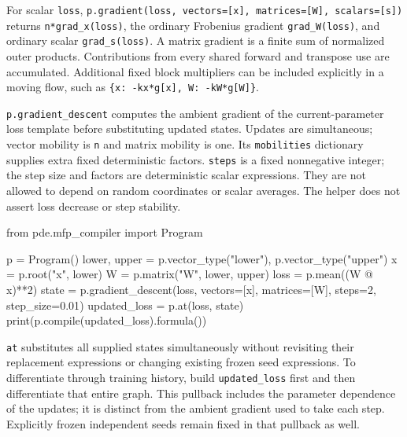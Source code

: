 \documentclass[
  11pt,
]{article}
\newenvironment{Shaded}{\begin{snugshade}}{\end{snugshade}}
\newcommand{\BuiltInTok}[1]{\textcolor[rgb]{0.00,0.23,0.31}{#1}}
\newcommand{\DecValTok}[1]{\textcolor[rgb]{0.68,0.00,0.00}{#1}}
\newcommand{\FloatTok}[1]{\textcolor[rgb]{0.68,0.00,0.00}{#1}}
\newcommand{\ImportTok}[1]{\textcolor[rgb]{0.00,0.46,0.62}{#1}}
\newcommand{\NormalTok}[1]{\textcolor[rgb]{0.00,0.23,0.31}{#1}}
\newcommand{\OperatorTok}[1]{\textcolor[rgb]{0.37,0.37,0.37}{#1}}
\newcommand{\StringTok}[1]{\textcolor[rgb]{0.13,0.47,0.30}{#1}}
\theoremstyle{definition}
\theoremstyle{plain}
\theoremstyle{plain}
\theoremstyle{plain}
\theoremstyle{remark}
\begin{document}
For scalar \texttt{loss},
\texttt{p.gradient(loss,\ vectors={[}x{]},\ matrices={[}W{]},\ scalars={[}s{]})}
returns \texttt{n*grad\_x(loss)}, the ordinary Frobenius gradient
\texttt{grad\_W(loss)}, and ordinary scalar \texttt{grad\_s(loss)}. A
matrix gradient is a finite sum of normalized outer products.
Contributions from every shared forward and transpose use are
accumulated. Additional fixed block multipliers can be included
explicitly in a moving flow, such as
\texttt{\{x:\ -kx*g{[}x{]},\ W:\ -kW*g{[}W{]}\}}.

\texttt{p.gradient\_descent} computes the ambient gradient of the
current-parameter loss template before substituting updated states.
Updates are simultaneous; vector mobility is \texttt{n} and matrix
mobility is one. Its \texttt{mobilities} dictionary supplies extra fixed
deterministic factors. \texttt{steps} is a fixed nonnegative integer;
the step size and factors are deterministic scalar expressions. They are
not allowed to depend on random coordinates or scalar averages. The
helper does not assert loss decrease or step stability.

\begin{Shaded}
\begin{Highlighting}[]
\ImportTok{from}\NormalTok{ pde.mfp\_compiler }\ImportTok{import}\NormalTok{ Program}

\NormalTok{p }\OperatorTok{=}\NormalTok{ Program()}
\NormalTok{lower, upper }\OperatorTok{=}\NormalTok{ p.vector\_type(}\StringTok{"lower"}\NormalTok{), p.vector\_type(}\StringTok{"upper"}\NormalTok{)}
\NormalTok{x }\OperatorTok{=}\NormalTok{ p.root(}\StringTok{"x"}\NormalTok{, lower)}
\NormalTok{W }\OperatorTok{=}\NormalTok{ p.matrix(}\StringTok{"W"}\NormalTok{, lower, upper)}
\NormalTok{loss }\OperatorTok{=}\NormalTok{ p.mean((W }\OperatorTok{@}\NormalTok{ x)}\OperatorTok{**}\DecValTok{2}\NormalTok{)}
\NormalTok{state }\OperatorTok{=}\NormalTok{ p.gradient\_descent(loss, vectors}\OperatorTok{=}\NormalTok{[x], matrices}\OperatorTok{=}\NormalTok{[W], steps}\OperatorTok{=}\DecValTok{2}\NormalTok{, step\_size}\OperatorTok{=}\FloatTok{0.01}\NormalTok{)}
\NormalTok{updated\_loss }\OperatorTok{=}\NormalTok{ p.at(loss, state)}
\BuiltInTok{print}\NormalTok{(p.}\BuiltInTok{compile}\NormalTok{(updated\_loss).formula())}
\end{Highlighting}
\end{Shaded}

\texttt{at} substitutes all supplied states simultaneously without
revisiting their replacement expressions or changing existing frozen
seed expressions. To differentiate through training history, build
\texttt{updated\_loss} first and then differentiate that entire graph.
This pullback includes the parameter dependence of the updates; it is
distinct from the ambient gradient used to take each step. Explicitly
frozen independent seeds remain fixed in that pullback as well.
\end{document}
